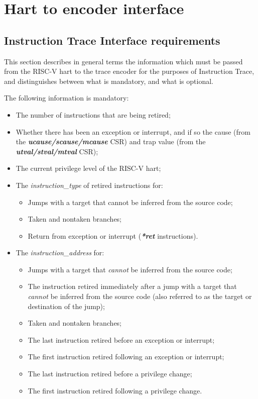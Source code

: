 \chapter{Hart to encoder interface} \label{Interface}

\section{Instruction Trace Interface requirements}\label{sec:InstructionInterfaceRequirements}

This section describes in general terms the information which must be
passed from the RISC-V hart to the trace encoder for the purposes of
Instruction Trace, and distinguishes between what is mandatory, and
what is optional.

The following information is mandatory:

\begin{itemize}
  \item The number of instructions that are being retired;
  \item Whether there has been an exception or interrupt, and if so the cause (from the \textbf{\textit{ucause/scause/mcause}} CSR)
        and trap value (from the \textbf{\textit{utval/stval/mtval}} CSR);
  \item The current privilege level of the RISC-V hart;
  \item The \textit{instruction\_type} of retired instructions for:
    \begin{itemize}
      \item Jumps with a target that cannot be inferred from the source code;
      \item Taken and nontaken branches;
      \item Return from exception or interrupt (\textbf{\textit{*ret}} instructions).
    \end{itemize}
  \item The \textit{instruction\_address} for:
    \begin{itemize}
      \item Jumps with a target that \textit{cannot} be inferred from the source code;
      \item The instruction retired immediately after a jump with a target that \textit{cannot} be inferred 
        from the source code (also referred to as the target or destination of the jump);
      \item Taken and nontaken branches;
      \item The last instruction retired before an exception or interrupt;
      \item The first instruction retired following an exception or interrupt;
      \item The last instruction retired before a privilege change;
      \item The first instruction retired following a privilege change.
    \end{itemize}
\end{itemize}

